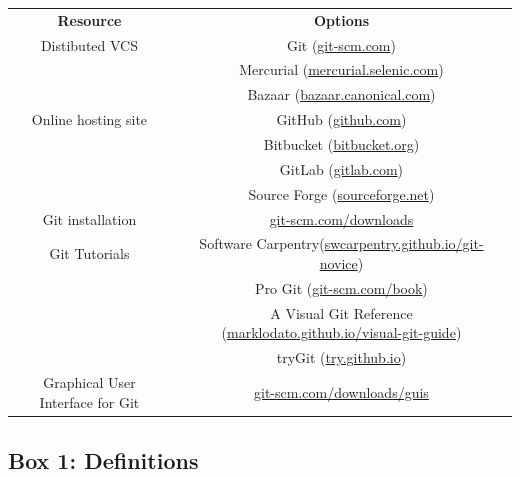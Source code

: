 \documentclass[10pt]{article}
\begin{document}
\begin{tabular}{ c c }
    \textbf{Resource} & \textbf{Options} \\
    Distibuted VCS & Git (\href{https://git-scm.com}{git-scm.com}) \\
                   & Mercurial (\href{https://mercurial.selenic.com}{mercurial.selenic.com}) \\
                   & Bazaar (\href{http://bazaar.canonical.com}{bazaar.canonical.com}) \\
    Online hosting site & GitHub (\href{https://github.com}{github.com}) \\
                        & Bitbucket (\href{https://bitbucket.org}{bitbucket.org}) \\
                        & GitLab (\href{https://about.gitlab.com}{gitlab.com}) \\
                        & Source Forge (\href{http://sourceforge.net}{sourceforge.net}) \\
    Git installation & \href{https://git-scm.com/downloads}{git-scm.com/downloads} \\
    Git Tutorials & Software Carpentry(\href{https://swcarpentry.github.io/git-novice}{swcarpentry.github.io/git-novice}) \\
                  & Pro Git (\href{https://git-scm.com/book}{git-scm.com/book}) \\
                  & A Visual Git Reference (\href{https://marklodato.github.io/visual-git-guide}{marklodato.github.io/visual-git-guide}) \\
                  & tryGit (\href{https://try.github.io}{try.github.io}) \\
    Graphical User Interface for Git & \href{https://git-scm.com/downloads/guis}{git-scm.com/downloads/guis} \\
\end{tabular}


\subsection{Box 1: Definitions}
\end{document}
